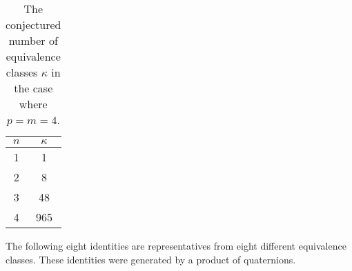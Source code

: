 \documentclass[12pt]{article}
\theoremstyle{definition}
\newcommand{\Zzz}{\mathbb Z}
\numberwithin{equation}{section}
\begin{document}
\begin{table}[h]

\label{table:4D}


\begin{center}


\begin{tabular}{ c | c }
 \( n \) & \( \kappa \) \\
\hline\hline
 1 & 1 \\
\hline
 2 & 8 \\
\hline
 3 & 48 \\
\hline
 4 & 965 
\end{tabular}





\end{center}
\caption{
The conjectured number of equivalence
classes \( \kappa \)  
in the case where \(p = m = 4\).
 }

\end{table}










The following eight identities are representatives from 
eight different equivalence classes. These identities
were generated by a product of quaternions. 
\end{document}
